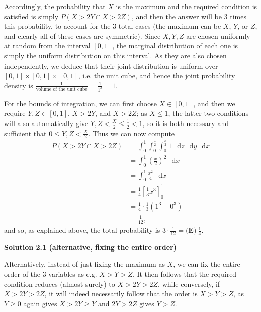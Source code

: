 \begin{enumerate}
 Accordingly, the probability that $X$ is the maximum and the required condition is satisfied is simply $P(X > 2Y \cap X > 2Z)$, and then the answer will be $3$ times this probability, to account for the $3$ total cases (the maximum can be $X$, $Y$, or $Z$, and clearly all of these cases are symmetric). Since $X,Y,Z$ are chosen uniformly at random from the interval $[0,1]$, the marginal distribution of each one is simply the uniform distribution on this interval. As they are also chosen independently, we deduce that their joint distribution is uniform over $[0,1] \times [0,1] \times [0,1]$, i.e. the unit cube, and hence the joint probability density is $\frac{1}{\text{volume of the unit cube}} = \frac{1}{1^3} = 1$.

 
For the bounds of integration, we can first choose $X \in [0,1]$, and then we require $Y,Z \in [0,1]$, $X > 2Y$, and $X > 2Z$; as $X \leq 1$, the latter two conditions will also automatically give $Y,Z < \frac{X}{2} \leq \frac{1}{2} < 1$, so it is both necessary and sufficient that $0 \leq Y,Z < \frac{X}{2}$. Thus we can now compute
 \begin{align*} P(X > 2Y \cap X > 2Z) &= \int_{0}^{1} \int_{0}^{\frac{x}{2}} \int_{0}^{\frac{x}{2}} 1 \, \mathop{}\!\mathrm{d}z \, \mathop{}\!\mathrm{d}y \, \mathop{}\!\mathrm{d}x \\ &= \int_{0}^{1} \left(\frac{x}{2}\right)^2 \, \mathop{}\!\mathrm{d}x \\ &= \int_{0}^{1} \frac{x^2}{4} \, \mathop{}\!\mathrm{d}x \\ &= \frac{1}{4}\left[\frac{1}{3}x^3\right]_{0}^{1} \\ &= \frac{1}{4} \cdot \frac{1}{3} \left(1^3-0^3\right) \\ &= \frac{1}{12}, \end{align*}
 and so, as explained above, the total probability is $3 \cdot \frac{1}{12} = \boxed{\textbf{(E)}~\frac{1}{4}}$.

 



\textbf{Solution 2.1 (alternative, fixing the entire order)}

Alternatively, instead of just fixing the maximum as $X$, we can fix the entire order of the $3$ variables as e.g. $X > Y > Z$. It then follows that the required condition reduces (almost surely) to $X > 2Y > 2Z$, while conversely, if $X > 2Y > 2Z$, it will indeed necessarily follow that the order is $X > Y > Z$, as $Y \geq 0$ again gives $X > 2Y \geq Y$ and $2Y > 2Z$ gives $Y > Z$.


\end{enumerate}

